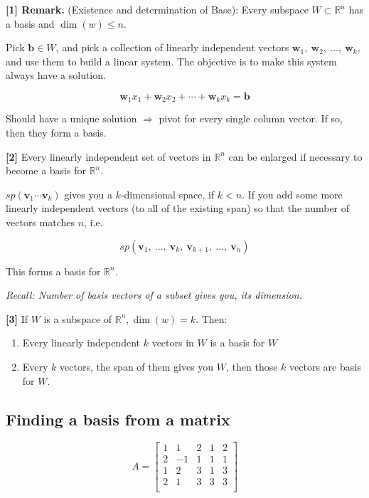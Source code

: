 \documentclass[12pt]{article}
\theoremstyle{plain}
\theoremstyle{remark}
\theoremstyle{definition}
\begin{document}
\textbf{{[}1{]} Remark.} (Existence and determination of Base): Every
subspace \(W \subset \mathbb{R}^{n}\) has a basis and
\(\dim(w) \leq n\).

Pick \(\mathbf{b} \in W\), and pick a collection of linearly
independent vectors
\({\mathbf{w}}_{1},\ {\mathbf{w}}_{2},\ \ldots,\ {\mathbf{w}}_{k}\),
and use them to build a linear system. The objective is to make this
system always have a solution.

\[{\mathbf{w}}_{1}x_{1} + {\mathbf{w}}_{2}x_{2} + ⋯ + {\mathbf{w}}_{k}x_{k} = \mathbf{b}\]

Should have a unique solution \(\Rightarrow\) pivot for every single
column vector. If so, then they form a basis.

\textbf{{[}2{]}} Every linearly independent set of vectors in
\(\mathbb{R}^{n}\) can be enlarged if necessary to become a basis for
\(\mathbb{R}^{n}\).

\(sp\left( {\mathbf{v}}_{1}\cdots{\mathbf{v}}_{k} \right)\)
gives you a \(k\)-dimensional space, if \(k < n\). If you add some more
linearly independent vectors (to all of the existing span) so that the
number of vectors matches \(n\), i.e.

\[sp\left( {\mathbf{v}}_{1},\ \ldots,\ {\mathbf{v}}_{k},\ {\mathbf{v}}_{k + 1},\ \ldots,\ {\mathbf{v}}_{n} \right)\]

This forms a basis for \(\mathbb{R}^{n}.\)

\emph{Recall: Number of basis vectors of a subset gives you, its
dimension.}

\textbf{{[}3{]}} If \(W\) is a subspace of
\(\mathbb{R}^{n},\dim(w) = k\). Then:

\begin{enumerate}
\def\labelenumi{\alph{enumi})}
\item
  Every linearly independent \(k\) vectors in \(W\) is a basis for \(W\)
\item
  Every \(k\) vectors, the span of them gives you \(W\), then those
  \(k\) vectors are basis for \(W\).
\end{enumerate}


\subsection{Finding a basis from a
matrix}

\[A = \begin{bmatrix}
1 & 1 & 2 & 1 & 2 \\
2 & - 1 & 1 & 1 & 1 \\
1 & 2 & 3 & 1 & 3 \\
2 & 1 & 3 & 3 & 3 \\
\end{bmatrix}\]
\end{document}
